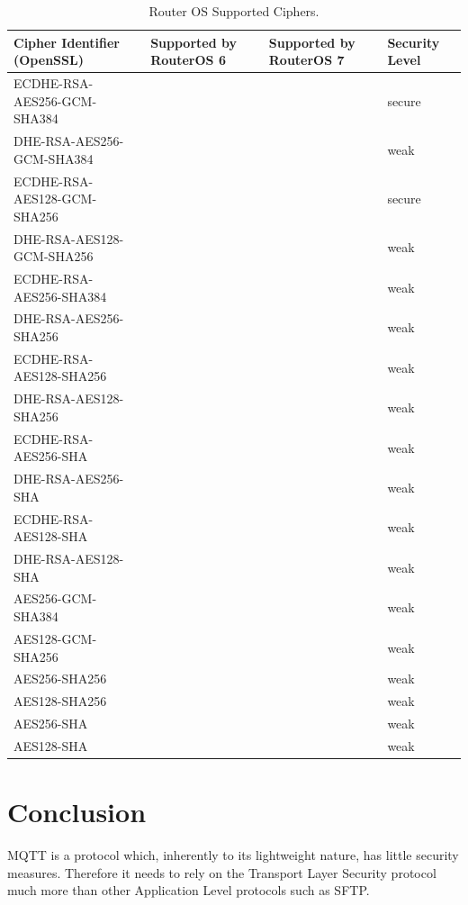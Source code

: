 \documentclass[binding=0.6cm,noexaminfo]{sapthesis}
\newcommand{\cmark}{\ding{51}}%
\newcommand{\xmark}{\ding{55}}%
\begin{document}
\begin{table}
\begin{center}
\begin{tabular}{| p{3cm} | p{3cm} | p{3cm} | p{3cm} |}
\hline
Cipher Identifier (OpenSSL) & Supported by RouterOS 6 & Supported by RouterOS 7 & Security Level \\
\hline
ECDHE-RSA-AES256-GCM-SHA384 & \cmark & \cmark & secure \\
\hline
DHE-RSA-AES256-GCM-SHA384 & \cmark & \cmark & weak \\
\hline
ECDHE-RSA-AES128-GCM-SHA256 & \cmark & \cmark & secure \\
\hline
DHE-RSA-AES128-GCM-SHA256 & \cmark & \cmark & weak \\
\hline
ECDHE-RSA-AES256-SHA384 & \cmark & \cmark & weak \\
\hline
DHE-RSA-AES256-SHA256 & \cmark & \xmark & weak \\
\hline
ECDHE-RSA-AES128-SHA256 & \cmark & \cmark & weak \\
\hline
DHE-RSA-AES128-SHA256 & \cmark & \xmark & weak \\
\hline
ECDHE-RSA-AES256-SHA & \cmark & \cmark & weak \\
\hline
DHE-RSA-AES256-SHA & \cmark & \cmark & weak \\
\hline
ECDHE-RSA-AES128-SHA & \cmark & \cmark & weak \\
\hline
DHE-RSA-AES128-SHA & \cmark & \cmark & weak \\
\hline
AES256-GCM-SHA384 & \cmark & \cmark & weak \\
\hline
AES128-GCM-SHA256 & \cmark & \xmark & weak \\
\hline
AES256-SHA256 & \cmark & \xmark & weak \\
\hline
AES128-SHA256 & \cmark & \cmark & weak \\
\hline
AES256-SHA & \cmark & \cmark & weak \\
\hline
AES128-SHA & \cmark & \cmark & weak \\
\hline
\end{tabular}
\caption{Router OS Supported Ciphers.}
\label{tab:routeros_ciphers}
\end{center}
\end{table}

\chapter{Conclusion}
MQTT is a protocol which, inherently to its lightweight nature, has little security measures. Therefore it needs to rely on the Transport Layer Security protocol much more than other Application Level protocols such as SFTP.
\end{document}
